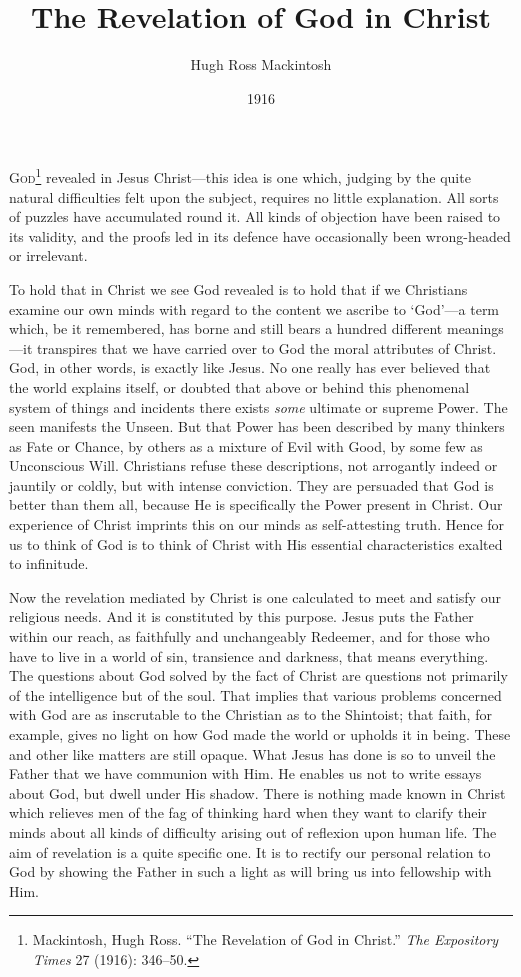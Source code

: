 \documentclass[12pt,a5paper]{article}
\title{The Revelation of God in Christ}
\author{Hugh Ross Mackintosh}
\date{1916}
\begin{document}
\maketitle

\textsc{God}\footnote{Mackintosh, Hugh Ross. ``The Revelation of God in Christ.'' \textit{The Expository Times} 27 (1916): 346--50.} revealed in Jesus Christ---this idea is one which, judging by the quite natural difficulties felt upon the subject, requires no little explanation. All sorts of puzzles have accumulated round it. All kinds of objection have been raised to its validity, and the proofs led in its defence have occasionally been wrong-headed or irrelevant. 

To hold that in Christ we see God revealed is to
hold that if we Christians examine our own minds with regard to the content we ascribe to `God'---a term which, be it remembered, has borne and still bears a hundred different meanings---it transpires that we have carried over to God the moral attributes of Christ. God, in other words, is exactly like Jesus. No one really has ever believed that the world explains itself, or doubted that above or
behind this phenomenal system of things and incidents there exists \textit{some} ultimate or supreme Power. The seen manifests the Unseen. But that Power has been described by many thinkers as Fate or Chance, by others as a mixture of Evil with Good, by some few as Unconscious Will. Christians refuse these descriptions, not arrogantly indeed or jauntily or coldly, but with intense conviction. They are persuaded that God is better than them all, because He is specifically the Power present in Christ. Our experience of Christ imprints this on our minds as self-attesting truth. Hence for us to think of God is to think of Christ with His essential characteristics exalted to infinitude. 

Now the revelation mediated by Christ is one calculated to meet and satisfy our religious needs. And it is constituted by this purpose. Jesus puts the Father within our reach, as faithfully and unchangeably Redeemer, and for those who have to live in a world of sin, transience and darkness, that means everything. The questions about God solved by the fact of Christ are questions not primarily of the intelligence but of the soul. That implies that various problems concerned with God are as inscrutable to the Christian as to the Shintoist; that faith, for example, gives no light on how God made the world or upholds it in being. These and other like matters are still opaque. What Jesus has done is so to unveil the Father that we have communion with Him. He enables us not to write essays about God, but dwell under His shadow. There is nothing made known in Christ which relieves men of the fag of thinking hard when they want to clarify their minds about all kinds of difficulty arising out of reflexion upon human life. The aim of revelation is a quite specific one. It is to rectify our personal relation to God by showing the Father in such a light as will bring us into fellowship with Him.
\end{document}
